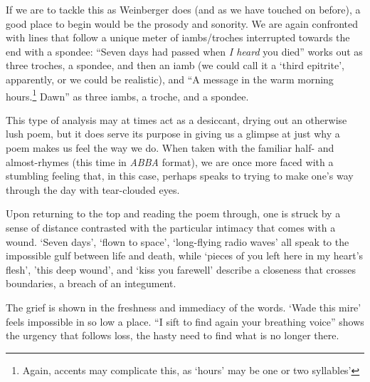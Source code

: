 \documentclass[12pt,oneside]{memoir}
\begin{document}
If we are to tackle this as Weinberger does (and as we have touched on before), a good place to begin would be the prosody and sonority. We are again confronted with lines that follow a unique meter of iambs/troches interrupted towards the end with a spondee: ``Seven days had passed when \emph{I heard} you died'' works out as three troches, a spondee, and then an iamb (we could call it a `third epitrite', apparently, or we could be realistic), and ``A message in the warm morning hours.\footnote{Again, accents may complicate this, as `hours' may be one or two syllables'} Dawn'' as three iambs, a troche, and a spondee. 

This type of analysis may at times act as a desiccant, drying out an otherwise lush poem, but it does serve its purpose in giving us a glimpse at just why a poem makes us feel the way we do. When taken with the familiar half- and almost-rhymes (this time in \emph{ABBA} format), we are once more faced with a stumbling feeling that, in this case, perhaps speaks to trying to make one's way through the day with tear-clouded eyes.

Upon returning to the top and reading the poem through, one is struck by a sense of distance contrasted with the particular intimacy that comes with a wound. `Seven days', `flown to space', `long-flying radio waves' all speak to the impossible gulf between life and death, while `pieces of you left here in my heart's flesh', 'this deep wound', and `kiss you farewell' describe a closeness that crosses boundaries, a breach of an integument.

The grief is shown in the freshness and immediacy of the words. `Wade this mire' feels impossible in so low a place. ``I sift to find again your breathing voice'' shows the urgency that follows loss, the hasty need to find what is no longer there.
\end{document}
